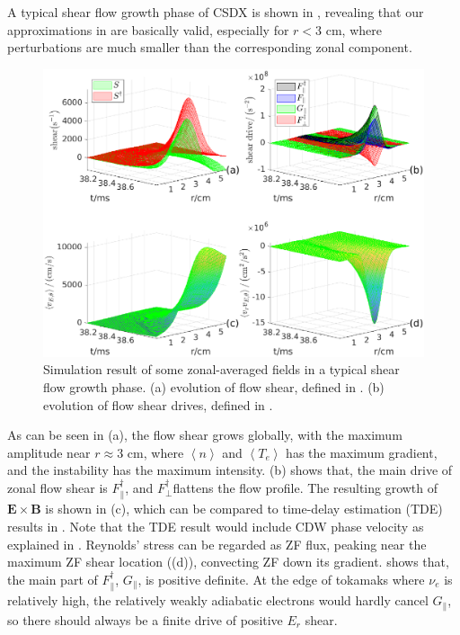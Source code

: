 \documentclass[aps,pre,twocolumn,superscriptaddress]{revtex4-2}
\begin{document}
A typical shear flow growth phase of CSDX is shown in , revealing that our approximations in  are basically valid, especially for $r<3$ cm, where perturbations are much smaller than the corresponding zonal component.
\begin{figure}[htb]
	\includegraphics[width=3.375 in]{acc_den_drive.eps}
	\caption{
		Simulation result of some zonal-averaged fields in a typical shear flow growth phase. (a) evolution of flow shear, defined in . (b) evolution of flow shear drives, defined in .
		\label{fig:acc_den_drive}	
	}
\end{figure}


As can be seen in (a), the flow shear grows globally, with the maximum amplitude near $r\approx 3$ cm, where $\left<n\right>$ and $\left<T_{e}\right>$ has the maximum gradient, and the instability has the maximum intensity. (b) shows that, the main drive of zonal flow shear is $F_{\parallel}^{\dagger}$, and $F_{\perp}^{\dagger}$flattens the flow profile. The resulting growth of $\bm{E}\times\bm{B}$ is shown in (c), which can be compared to time-delay estimation (TDE) results in \cite{PhysRevLett.104.065002,doi:10.1063/1.3322823}. Note that the TDE result would include CDW phase velocity as explained in \cite{PhysRevE.100.033212}. Reynolds' stress can be regarded as ZF flux, peaking near the maximum ZF shear location ((d)), convecting ZF down its gradient.  shows that, the main part of $F_{\parallel}^{\dagger}$, $G_{\parallel}$, is positive definite. At the edge of tokamaks where $\nu_{e}$ is relatively high, the relatively weakly adiabatic electrons would hardly cancel $G_{\parallel}$, so there should always be a finite drive of positive $E_{r}$ shear. 
\end{document}
